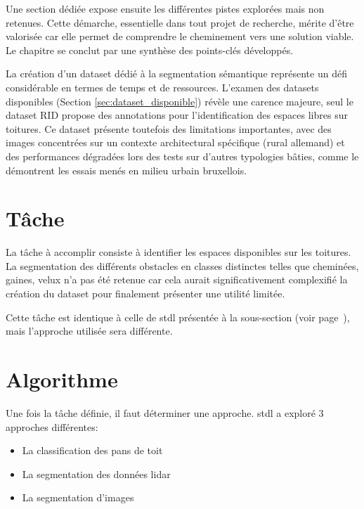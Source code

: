 Une section dédiée expose ensuite les différentes pistes explorées mais non retenues. Cette démarche, essentielle dans tout projet de recherche, mérite d'être valorisée car elle permet de comprendre le cheminement vers une solution viable. Le chapitre se conclut par une synthèse des points-clés développés.

La création d'un dataset dédié à la segmentation sémantique représente un défi considérable en termes de temps et de ressources. L'examen des datasets disponibles (Section \ref{sec:dataset_disponible}) révèle une carence majeure, seul le dataset RID propose des annotations pour l'identification des espaces libres sur toitures. Ce dataset présente toutefois des limitations importantes, avec des images concentrées sur un contexte architectural spécifique (rural allemand) et des performances dégradées lors des tests sur d'autres typologies bâties, comme le démontrent les essais menés en milieu urbain bruxellois.

\section{Tâche}
La tâche à accomplir consiste à identifier les espaces disponibles sur les toitures. La segmentation des différents obstacles en classes distinctes telles que cheminées, gaines, velux n'a pas été retenue car cela aurait significativement complexifié la création du dataset pour finalement présenter une utilité limitée.

Cette tâche est identique à celle de \acrshort{stdl} présentée à la sous-section \textit{} (voir page~\pageref{subsec:stdl_analyse}), mais l'approche utilisée sera différente.

\section{Algorithme}
Une fois la tâche définie, il faut déterminer une approche. \acrshort{stdl} a exploré 3 approches différentes:
\begin{itemize}
    \item La classification des pans de toit
    \item La segmentation des données \gls{lidar}
    \item La segmentation d'images
\end{itemize}

